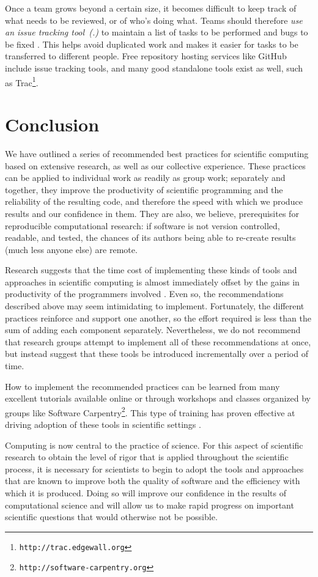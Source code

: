 \documentclass{article}
\newcommand{\footurl}[1]{\footnote{\texttt{#1}}}
\newcounter{PracticeSection}
\newcounter{PracticeIdentifier}[PracticeSection]
\newcommand{\practice}[1]{\stepcounter{PracticeIdentifier}\emph{{#1}~(\arabic{PracticeSection}.\arabic{PracticeIdentifier})}}
\begin{document}
Once a team grows beyond a certain size, it becomes difficult to keep
track of what needs to be reviewed, or of who's doing what.  Teams
should therefore \practice{use an issue tracking tool} to maintain a
list of tasks to be performed and bugs to be fixed
\cite{dubois2003a}. This helps avoid duplicated work and makes it
easier for tasks to be transferred to different people. Free
repository hosting services like GitHub include issue tracking tools,
and many good standalone tools exist as well, such as
Trac\footurl{http://trac.edgewall.org}.

\section{Conclusion}\label{conclusion}

We have outlined a series of recommended best practices for scientific
computing based on extensive research, as well as our collective
experience.  These practices can be applied to individual work as
readily as group work; separately and together, they improve the
productivity of scientific programming and the reliability of the
resulting code, and therefore the speed with which we produce results
and our confidence in them.  They are also, we believe, prerequisites
for reproducible computational research: if software is not version
controlled, readable, and tested, the chances of its authors being
able to re-create results (much less anyone else) are remote.

Research suggests that the time cost of implementing these kinds of
tools and approaches in scientific computing is almost immediately
offset by the gains in productivity of the programmers involved
\cite{aranda2012}. Even so, the recommendations described above may
seem intimidating to implement.  Fortunately, the different practices
reinforce and support one another, so the effort required is less than
the sum of adding each component separately. Nevertheless, we do not
recommend that research groups attempt to implement all of these
recommendations at once, but instead suggest that these tools be
introduced incrementally over a period of time.

How to implement the recommended practices can be learned from many
excellent tutorials available online or through workshops and classes
organized by groups like Software
Carpentry\footurl{http://software-carpentry.org}. This type of
training has proven effective at driving adoption of these tools in
scientific settings \cite{aranda2012}.

Computing is now central to the practice of science. For this aspect
of scientific research to obtain the level of rigor that is applied
throughout the scientific process, it is necessary for scientists to
begin to adopt the tools and approaches that are known to improve both
the quality of software and the efficiency with which it is
produced. Doing so will improve our confidence in the results of
computational science and will allow us to make rapid progress on
important scientific questions that would otherwise not be possible.



\end{document}
